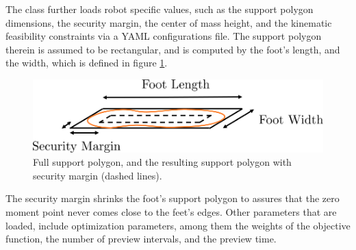 The  class further loads robot specific values, such as the support polygon dimensions, the security margin, the center of mass height, and the kinematic feasibility constraints via a YAML \cite{ben2005yaml} configurations file. The support polygon therein is assumed to be rectangular, and is computed by the foot's length, and the width, which is defined in figure \ref{fig::62_support_polygon}. 
\begin{figure}[h!]
	\centering
	\includegraphics[scale=.5]{chapters/02_foundations_for_humanoid_walking/img/support_polygon.png}
	\caption{Full support polygon, and the resulting support polygon with security margin (dashed lines).}
	\label{fig::62_support_polygon}
\end{figure}
The security margin shrinks the foot's support polygon to assures that the zero moment point never comes close to the feet's edges. Other parameters that are loaded, include optimization parameters, among them the weights of the objective function, the number of preview intervals, and the preview time.
\FloatBarrier
